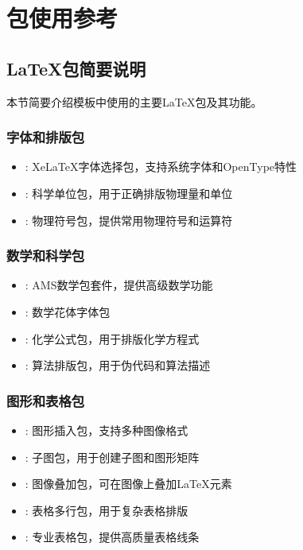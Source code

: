 \chapter{包使用参考}
\label{chap:chap2}

\section{LaTeX包简要说明}
\label{sec:package_description}

本节简要介绍模板中使用的主要LaTeX包及其功能。

\subsection{字体和排版包}

\begin{itemize}
    \item {}: XeLaTeX字体选择包，支持系统字体和OpenType特性
    \item {}: 科学单位包，用于正确排版物理量和单位
    \item {}: 物理符号包，提供常用物理符号和运算符
\end{itemize}

\subsection{数学和科学包}

\begin{itemize}
    \item {}: AMS数学包套件，提供高级数学功能
    \item {}: 数学花体字体包
    \item {}: 化学公式包，用于排版化学方程式
    \item {}: 算法排版包，用于伪代码和算法描述
\end{itemize}

\subsection{图形和表格包}

\begin{itemize}
    \item {}: 图形插入包，支持多种图像格式
    \item {}: 子图包，用于创建子图和图形矩阵
    \item {}: 图像叠加包，可在图像上叠加LaTeX元素
    \item {}: 表格多行包，用于复杂表格排版
    \item {}: 专业表格包，提供高质量表格线条
\end{itemize}

